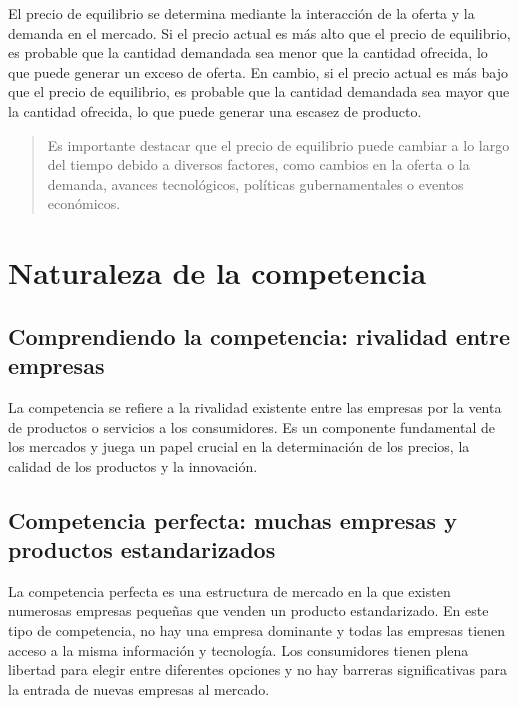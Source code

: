 \documentclass[
  man,
  floatsintext,
  longtable,
  a4paper,
  nolmodern,
  notxfonts,
  notimes,
  colorlinks=true,linkcolor=blue,citecolor=blue,urlcolor=blue]{apa7}
\begin{document}
El precio de equilibrio se determina mediante la interacción de la
oferta y la demanda en el mercado. Si el precio actual es más alto que
el precio de equilibrio, es probable que la cantidad demandada sea menor
que la cantidad ofrecida, lo que puede generar un exceso de oferta. En
cambio, si el precio actual es más bajo que el precio de equilibrio, es
probable que la cantidad demandada sea mayor que la cantidad ofrecida,
lo que puede generar una escasez de producto.

\begin{quote}
Es importante destacar que el precio de equilibrio puede cambiar a lo
largo del tiempo debido a diversos factores, como cambios en la oferta o
la demanda, avances tecnológicos, políticas gubernamentales o eventos
económicos.
\end{quote}

\section{Naturaleza de la
competencia}\label{naturaleza-de-la-competencia}

\subsection{Comprendiendo la competencia: rivalidad entre
empresas}\label{comprendiendo-la-competencia-rivalidad-entre-empresas}

La competencia se refiere a la rivalidad existente entre las empresas
por la venta de productos o servicios a los consumidores. Es un
componente fundamental de los mercados y juega un papel crucial en la
determinación de los precios, la calidad de los productos y la
innovación.

\subsection{Competencia perfecta: muchas empresas y productos
estandarizados}\label{competencia-perfecta-muchas-empresas-y-productos-estandarizados}

La competencia perfecta es una estructura de mercado en la que existen
numerosas empresas pequeñas que venden un producto estandarizado. En
este tipo de competencia, no hay una empresa dominante y todas las
empresas tienen acceso a la misma información y tecnología. Los
consumidores tienen plena libertad para elegir entre diferentes opciones
y no hay barreras significativas para la entrada de nuevas empresas al
mercado.
\end{document}
